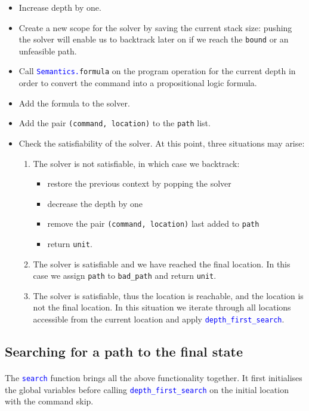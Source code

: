 \documentclass[letterpaper,12pt]{article}
\begin{document}
\begin{itemize}
\item Increase depth by one.
\item Create a new scope for the solver by saving the current stack size: pushing the solver will enable us to backtrack later on if we reach the \texttt{bound} or an unfeasible path.
\item Call \texttt{\textcolor{blue}{Semantics.}formula} on the program operation for the current depth in order to convert the command into a propositional logic formula.
\item Add the formula to the solver.
\item Add the pair \texttt{(command, location)} to the \texttt{path} list.
\item Check the satisfiability of the solver. At this point, three situations may arise:
\begin{enumerate}
\item{The solver is not satisfiable, in which case we backtrack:
\begin{itemize}
\item restore the previous context by popping the solver
\item decrease the depth by one
\item remove the pair \texttt{(command, location)} last added to \texttt{path}
\item return \texttt{unit}.
\end{itemize}
}
\item The solver is satisfiable and we have reached the final location. In this case we assign \texttt{path} to \texttt{bad\_path} and return \texttt{unit}.
\item The solver is satisfiable, thus the location is reachable, and the location is not the final location. In this situation we iterate through all locations accessible from the current location and apply \texttt{\textcolor{blue}{depth\_first\_search}}.
\end{enumerate}
\end{itemize}

\subsection{Searching for a path to the final state}
\paragraph{}
The \texttt{\textcolor{blue}{search}} function brings all the above functionality together.
It first initialises the global variables before calling \texttt{\textcolor{blue}{depth\_first\_search}} on the initial location with the command skip.
\end{document}
